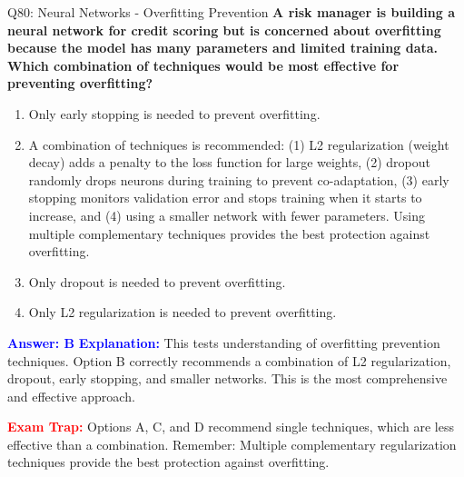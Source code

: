 \documentclass[8pt]{beamer}
\begin{document}
	\begin{frame}{Q80: Neural Networks - Overfitting Prevention}
		\fontsize{6.5}{7.5}\selectfont
		\textbf{A risk manager is building a neural network for credit scoring but is concerned about overfitting because the model has many parameters and limited training data. Which combination of techniques would be most effective for preventing overfitting?}
		
		\begin{enumerate}
			\item Only early stopping is needed to prevent overfitting.
			\item A combination of techniques is recommended: (1) L2 regularization (weight decay) adds a penalty to the loss function for large weights, (2) dropout randomly drops neurons during training to prevent co-adaptation, (3) early stopping monitors validation error and stops training when it starts to increase, and (4) using a smaller network with fewer parameters. Using multiple complementary techniques provides the best protection against overfitting.
			\item Only dropout is needed to prevent overfitting.
			\item Only L2 regularization is needed to prevent overfitting.
		\end{enumerate}
		
		\vspace{0.1cm}
		\textcolor{blue}{\textbf{Answer: B}}
		\vspace{0.1cm}
		\textcolor{blue}{\textbf{Explanation:}} This tests understanding of overfitting prevention techniques. Option B correctly recommends a combination of L2 regularization, dropout, early stopping, and smaller networks. This is the most comprehensive and effective approach.
		
		\textcolor{red}{\textbf{Exam Trap:}} Options A, C, and D recommend single techniques, which are less effective than a combination. Remember: Multiple complementary regularization techniques provide the best protection against overfitting.
	\end{frame}
	
\end{document}
